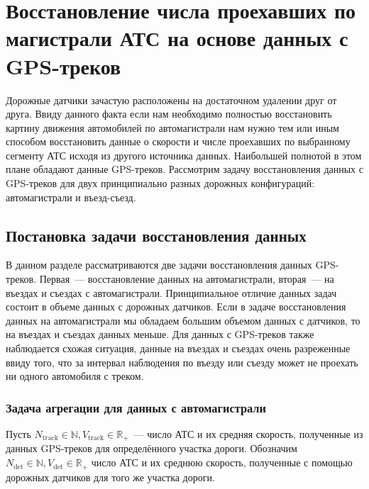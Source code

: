 \chapter{Восстановление числа проехавших по магистрали АТС на основе данных с GPS-треков}\label{ch:ch2_5}

Дорожные датчики зачастую расположены на достаточном удалении друг от друга.
Ввиду данного факта если нам необходимо полностью восстановить картину движения автомобилей по автомагистрали нам нужно тем или иным способом восстановить данные о скорости и числе проехавших по выбранному сегменту АТС исходя из другого источника данных.
Наибольшей полнотой в этом плане обладают данные GPS-треков.
Рассмотрим задачу восстановления данных с GPS-треков для двух принципиально разных дорожных конфигураций: автомагистрали и въезд-съезд.

\section{Постановка задачи восстановления данных}
В данном разделе рассматриваются две задачи восстановления данных GPS-треков.
Первая~--- восстановление данных на автомагистрали, вторая~--- на въездах и съездах с автомагистрали.
Принципиальное отличие данных задач состоит в объеме данных с дорожных датчиков.
Если в задаче восстановления данных на автомагистрали мы обладаем большим объемом данных с датчиков, то на въездах и съездах данных меньше.
Для данных с GPS-треков также наблюдается схожая ситуация, данные на въездах и съездах очень разреженные ввиду того, что за интервал наблюдения по въезду или съезду может не проехать ни одного автомобиля с треком.

\subsection{Задача агрегации для данных с автомагистрали}
\label{sect::data_agregation_road}
Пусть $N_\text{track} \in \mathbb{N}, V_\text{track}  \in \mathbb{R}_{+}$~--- число АТС и их средняя скорость, полученные из данных GPS-треков для определённого участка дороги.
Обозначим $N_\text{det} \in \mathbb{N}, V_\text{det} \in \mathbb{R}_{+}$ число АТС и их среднюю скорость, полученные с помощью дорожных датчиков для того же участка дороги.

